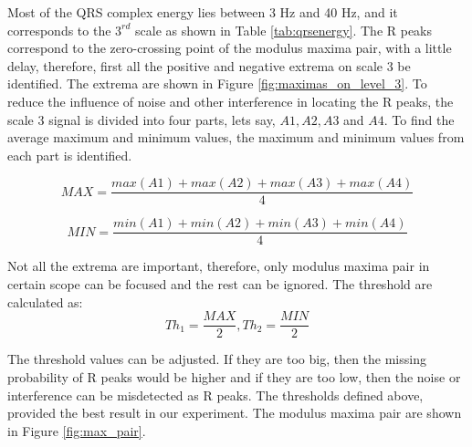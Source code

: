 Most of the QRS complex energy lies between 3 Hz and 40 Hz, and it corresponds to the $3^{rd}$ scale as shown in Table \ref{tab:qrsenergy}. The R peaks correspond to the zero-crossing point of the modulus maxima pair, with a little delay, therefore, first all the positive and negative extrema on scale 3 be identified. The extrema are shown in Figure \ref{fig:maximas_on_level_3}.  To reduce the influence of noise and other interference in locating the R peaks, the scale 3 signal is divided into four parts, lets say, $A1, A2, A3$ and $A4$. To find the average maximum and minimum values, the maximum and minimum values from each part is identified.


\begin{equation} 
{ MAX = \frac{max(A1) + max(A2) + max(A3) + max(A4)}{4}}
\end{equation}


\begin{equation} 
{ MIN = \frac{min(A1) + min(A2) + min(A3) + min(A4)}{4}}
\end{equation}


Not all the extrema are important, therefore, only modulus maxima pair in certain scope can be focused and the rest can be ignored. The threshold are calculated as:
\begin{equation}  \label{eqn:thresholds}
{ Th_1 = \frac{MAX}{2}} , { Th_2 = \frac{MIN}{2}} 
\end{equation}

The threshold values can be adjusted. If they are too big, then the missing probability of R peaks would be higher and if they are too low, then the noise or interference can be misdetected as R peaks. The thresholds defined above, provided the best result in our experiment. The modulus maxima pair are shown in Figure \ref{fig:max_pair}.

